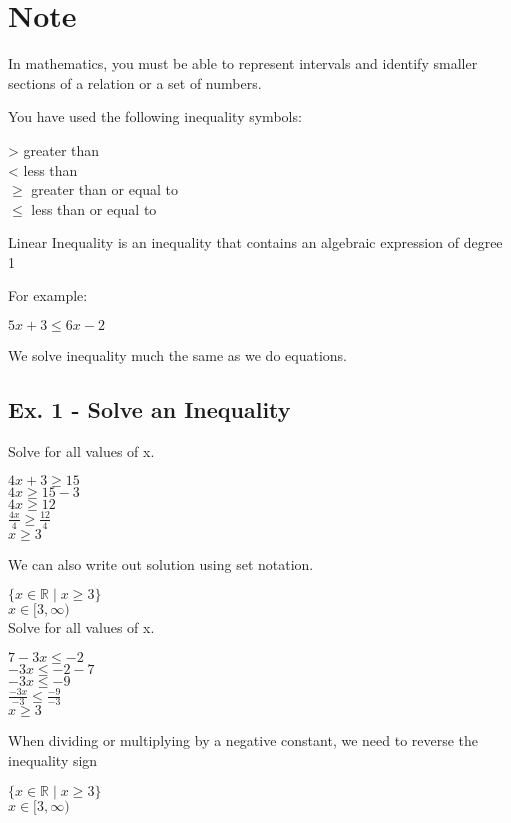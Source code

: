 \documentclass[11pt]{article}
\date{\today}
\title{}
\begin{document}
\setlength{\parindent}{0pt}
\section*{Note}
\label{sec:org8b9657a}

In mathematics, you must be able to represent intervals and identify smaller sections of a relation or a set of numbers.

You have used the following inequality symbols:

> greater than\\
< less than\\
\(\geq\) greater than or equal to\\
\(\le\) less than or equal to

Linear Inequality is an inequality that contains an algebraic expression of degree 1

For example:

\(5x+3 \le 6x-2\)

We solve inequality much the same as we do equations.

\subsection*{Ex. 1 - Solve an Inequality}
\label{sec:orgc9a9002}

Solve for all values of x.

\(4x+3 \geq 15\)\\
\(4x \geq 15-3\)\\
\(4x \geq 12\)\\
\(\frac{4x}{4} \geq \frac{12}{4}\)\\
\(x \geq 3\)

We can also write out solution using set notation.

\(\{x\in \mathbb{R} \mid x \geq 3\}\)\\
\(x\in[3,\infty)\)\\

Solve for all values of x.

\(7-3x\le-2\)\\
\(-3x\le-2-7\)\\
\(-3x\le-9\)\\
\(\frac{-3x}{-3}\le\frac{-9}{-3}\)\\
\(x\geq3\)

When dividing or multiplying by a negative constant, we need to reverse the inequality sign

\(\{x \in \mathbb{R} \mid x \geq 3\}\)\\
\(x \in [3, \infty)\)
\end{document}
